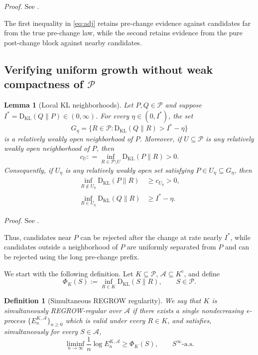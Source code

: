 \documentclass[12pt]{article}
\theoremstyle{spaced}
\newtheorem{lemma}[lemma]{Lemma}
\newtheorem{definition}[definition]{Definition}
\theoremstyle{remark}
\newcommand{\calP}{\mathcal P}
\newcommand{\KL}{\mathrm{D}_{\text{KL}}}
\newcommand{\defeq}{\mathrel{\mathop:}=}
\begin{document}
\emph{Proof.} See .


The first inequality in \eqref{eq:adj} retains pre-change evidence against candidates
far from the true pre-change law, while the second retains evidence
from the pure post-change block against nearby candidates.


\subsection{Verifying uniform growth without weak compactness of $\calP$}\label{sec:local-witnesses}



\begin{lemma}[Local KL neighborhoods]\label{lem:neighborhoods}
Let $P,Q\in\calP$ and suppose $I^*=\KL(Q\|P)\in(0,\infty)$.  For every $\eta\in(0,I^*)$, the set
\[
  G_\eta=\{R\in\calP:\KL(Q\|R)>I^*-\eta\}
\]
is a relatively weakly open neighborhood of $P$.  Moreover, if $U\subseteq\calP$ is any relatively weakly open neighborhood of $P$, then
\[
  c_U\defeq \inf_{R\in\calP\setminus U}\KL(P\|R)>0.
\]
Consequently, if $U_\eta$ is any relatively weakly open set satisfying $P\in U_\eta\subseteq G_\eta$, then
\begin{align}
  \inf_{R\notin U_\eta}\KL(P\|R)&\ge c_{U_\eta}>0,\label{eq:separate-P}\\
  \inf_{R\in U_\eta}\KL(Q\|R)&\ge I^*-\eta.\label{eq:local-Q}
\end{align}
\end{lemma}


\emph{Proof.} See .


Thus, candidates near $P$ can be rejected after the change at rate
nearly $I^*$, while candidates outside a neighborhood of $P$ are
uniformly separated from $P$ and can be rejected using the long
pre-change prefix.




We start with the following definition.
Let $K\subseteq\calP$, $ \mathcal A\subseteq K^c$, and define
\[
    \Phi_K(S)
    :=
    \inf_{R\in K}\KL(S\|R),
    \qquad S\in\calP.
\]
\begin{definition}[Simultaneous REGROW regularity]
\label{def:simultaneous-regrow}
We say that $K$ is \emph{simultaneously REGROW-regular over
$\mathcal A$} if there exists a single nondecreasing e-process $\{E_n^{K,\mathcal A}\}_{n\ge 0}$
which is valid under every $R\in K$, and satisfies, simultaneously for every
$S\in\mathcal A$,
\[
    \liminf_{n\to\infty}
    \frac{1}{n}\log E_n^{K,\mathcal A}
    \ge
    \Phi_K(S),
    \qquad
    S^\infty\text{-a.s.}
\]
\end{definition}
\end{document}
